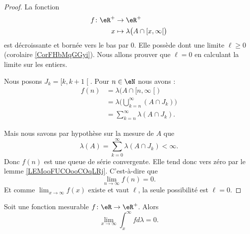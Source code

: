\begin{proof}
	La fonction
	\begin{equation}
		\begin{aligned}
			f\colon \eR^+ & \to \eR^+                                                         \\
			x             & \mapsto \lambda\big( A\cap\mathopen[ x , \infty \mathclose[ \big)
		\end{aligned}
	\end{equation}
	est décroissante et bornée vers le bas par \( 0\). Elle possède dont une limite \( \ell\geq 0\) (corolaire \ref{CorFHbMqGGyi}). Nous allons prouver que \( \ell=0\) en calculant la limite sur les entiers.

	Nous posons \( J_k=\mathopen[ k , k+1 \mathclose[\). Pour \( n\in \eN\) nous avons :
	\begin{subequations}
		\begin{align}
			f(n) & =\lambda\big( A\cap\mathopen[ n , \infty \mathclose[ \big) \\
			     & =\lambda\big( \bigcup_{k=n}^{\infty}(A\cap J_k) \big)      \\
			     & =\sum_{k=n}^{\infty}\lambda(A\cap J_k).
		\end{align}
	\end{subequations}

	Mais nous savons par hypothèse sur la mesure de \( A\) que
	\begin{equation}
		\lambda(A)=\sum_{k=0}^{\infty}\lambda(A\cap J_k)<\infty.
	\end{equation}
	Donc \( f(n)\) est une queue de série convergente. Elle tend donc vers zéro par le lemme \ref{LEMooFUCOooCOqLRj}. C'est-à-dire que
	\begin{equation}
		\lim_{n\to \infty} f(n)=0.
	\end{equation}
	Et comme \( \lim_{x\to \infty}f(x) \) existe et vaut \( \ell\), la seule possibilité est \( \ell=0\).
\end{proof}

\begin{lemma}       \label{LEMooMUHWooZPbMDb}
	Soit une fonction mesurable \( f\colon \eR\to \eR^+\). Alors
	\begin{equation}
		\lim_{x\to \infty} \int_x^{\infty}fd\lambda=0.
	\end{equation}
\end{lemma}

